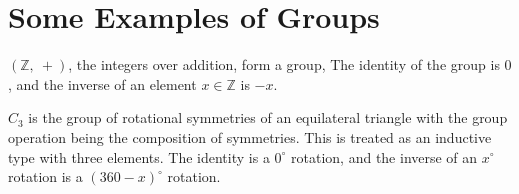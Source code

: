 \section{Some Examples of Groups}

\begin{definition}
    \label{definition : Int}
    \leanok
    $(\mathbb{Z},~ +)$, the integers over addition, form a group, The identity
    of the group is $0$, and the inverse of an element
    $x \in \mathbb{Z}$ is $-x$.
\end{definition}

\begin{definition}[$C_3$]
    \label{definition : C₃}
    \leanok
    $C_3$ is the group of rotational symmetries of an equilateral triangle with
    the group operation being the composition of symmetries.
    This is treated as an inductive type with three elements. The
    identity is a $ 0 ^{\circ} $ rotation, and the inverse of an  $x ^{\circ} $
    rotation is a $(360 - x)^{\circ} $ rotation.
\end{definition}
